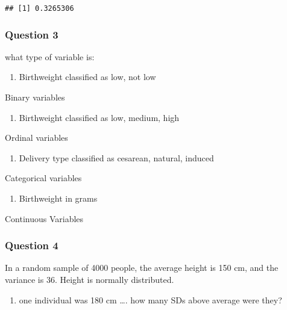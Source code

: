 \documentclass[
]{article}
\providecommand{\tightlist}{%
  \setlength{\itemsep}{0pt}\setlength{\parskip}{0pt}}
\begin{document}
\begin{verbatim}
## [1] 0.3265306
\end{verbatim}

\hypertarget{question-3}{%
\subsubsection{Question 3}\label{question-3}}

what type of variable is:

\begin{enumerate}
\def\labelenumi{\alph{enumi})}
\tightlist
\item
  Birthweight classified as low, not low
\end{enumerate}

Binary variables

\begin{enumerate}
\def\labelenumi{\alph{enumi})}
\setcounter{enumi}{1}
\tightlist
\item
  Birthweight classified as low, medium, high
\end{enumerate}

Ordinal variables

\begin{enumerate}
\def\labelenumi{\alph{enumi})}
\setcounter{enumi}{2}
\tightlist
\item
  Delivery type classified as cesarean, natural, induced
\end{enumerate}

Categorical variables

\begin{enumerate}
\def\labelenumi{\alph{enumi})}
\setcounter{enumi}{3}
\tightlist
\item
  Birthweight in grams
\end{enumerate}

Continuous Variables

\hypertarget{question-4}{%
\subsubsection{Question 4}\label{question-4}}

In a random sample of 4000 people, the average height is 150 cm, and the
variance is 36. Height is normally distributed.

\begin{enumerate}
\def\labelenumi{\alph{enumi})}
\tightlist
\item
  one individual was 180 cm \ldots. how many SDs above average were
  they?
\end{enumerate}
\end{document}
